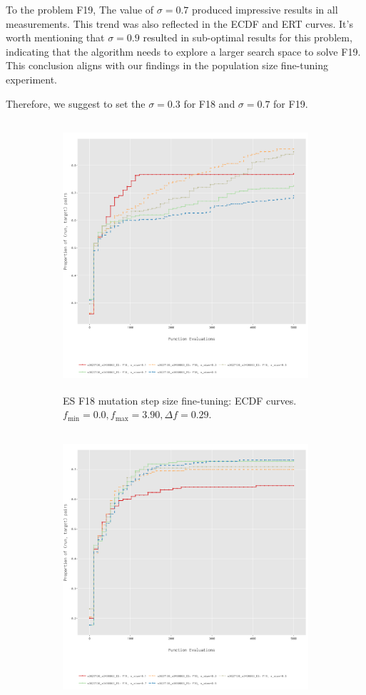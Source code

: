 \documentclass{article}
\begin{document}
To the problem F19, The value of $\sigma=0.7$ produced impressive results in all measurements. This trend was also reflected in the ECDF and ERT curves. It's worth mentioning that $\sigma=0.9$ resulted in sub-optimal results for this problem, indicating that the algorithm needs to explore a larger search space to solve F19. This conclusion aligns with our findings in the population size fine-tuning experiment.

Therefore, we suggest to set the $\sigma=0.3$ for F18 and $\sigma=0.7$ for F19.

\begin{figure}[!ht]
    \centering
    \begin{subfigure}[h]{0.95\linewidth}
        \includegraphics[width=\linewidth, height=10cm]{es/f18/ECDF18ss.png}
        \caption{ES F18 mutation step size fine-tuning: ECDF curves. $f_{\min} = 0.0, f_{\max} = 3.90, \Delta f = 0.29$.}
    \end{subfigure}
    \hfill
    \begin{subfigure}[h]{0.95\linewidth}
        \includegraphics[width=\linewidth, height=10cm]{es/f19/ECDF19ss.png}

\end{subfigure}
\end{figure}
\end{document}
